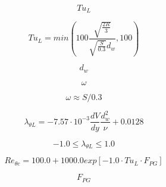 {\newpage\clearpage
{}%
\begin{displaymath}
Tu_{L}
\end{displaymath}%
\lthtmldisplayZ
\lthtmlcheckvsize\clearpage}

{\newpage\clearpage
{}%
\begin{displaymath}
Tu_{L}=min(100 \frac{\sqrt{\frac{2R}{3}}}{\sqrt{\frac{S}{0.3}}d_{w}}, 100)
\end{displaymath}%
\lthtmldisplayZ
\lthtmlcheckvsize\clearpage}

{\newpage\clearpage
{}%
\begin{displaymath}
d_w
\end{displaymath}%
\lthtmldisplayZ
\lthtmlcheckvsize\clearpage}

{\newpage\clearpage
{}%
\begin{displaymath}
\omega
\end{displaymath}%
\lthtmldisplayZ
\lthtmlcheckvsize\clearpage}

{\newpage\clearpage
{}%
\begin{displaymath}
\omega \approx S/0.3
\end{displaymath}%
\lthtmldisplayZ
\lthtmlcheckvsize\clearpage}

{\newpage\clearpage
{}%
\begin{displaymath}
\lambda _{\theta L}=-7.57\cdot 
10^{-3}\frac{dV}{dy}\frac{d_{w}^{2}}{\nu }+0.0128
\end{displaymath}%
\lthtmldisplayZ
\lthtmlcheckvsize\clearpage}

{\newpage\clearpage
{}%
\begin{displaymath}
-1.0 \leq \lambda _{\theta L} \leq 1.0
\end{displaymath}%
\lthtmldisplayZ
\lthtmlcheckvsize\clearpage}

{\newpage\clearpage
{}%
\begin{displaymath}
Re_{\theta c}=100.0+1000.0exp[-1.0 \cdot Tu_{L} \cdot F_{PG}]
\end{displaymath}%
\lthtmldisplayZ
\lthtmlcheckvsize\clearpage}

{\newpage\clearpage
{}%
\begin{displaymath}
F_{PG}
\end{displaymath}%
\lthtmldisplayZ
\lthtmlcheckvsize\clearpage}

